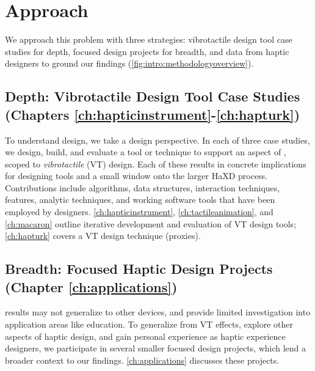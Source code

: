 \section{Approach}
We approach this problem with three strategies: vibrotactile design tool case studies for depth,  %
focused design projects for breadth, and data from haptic designers to ground our findings  (\autoref{fig:intro:methodologyoverview}).

\subsection{Depth: Vibrotactile Design Tool Case Studies (Chapters \ref{ch:hapticinstrument}-\ref{ch:hapturk})}
To understand design, we take a design perspective.
In each of three case studies, we design, build, and evaluate a tool or technique to support an aspect of \haxd, scoped to \emph{vibrotactile} (VT) design.
Each of these results in concrete implications for designing tools and a small window onto the larger HaXD process.
Contributions include algorithms, data structures, interaction techniques, features, analytic techniques, and working software tools that have been employed by designers.
\autoref{ch:hapticinstrument}, \autoref{ch:tactileanimation}, and \autoref{ch:macaron} outline iterative development and evaluation of VT design tools; \autoref{ch:hapturk} covers a VT design technique (proxies).

\subsection{Breadth: Focused Haptic Design Projects (Chapter \ref{ch:applications})}
 results may not generalize to other devices, and provide limited investigation into application areas like education.
To generalize from VT effects, explore other aspects of haptic design, and gain personal experience as haptic experience designers, we participate in several smaller focused design projects, which lend a broader context to our findings.
\autoref{ch:applications} discusses these projects.

